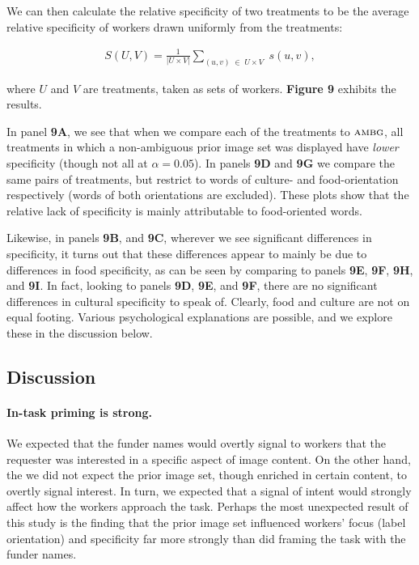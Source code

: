 \documentclass[a4paper]{report}
\begin{document}
We can then calculate the relative specificity of two treatments to be the
average relative specificity of workers drawn uniformly from the treatments:

\begin{align}
	S(U,V) = 
		\frac{1}{|U \times V|}
		\sum_{(u,v) \; \in \; U \times V} \;
		s(u,v),
		\label{eq:specificity}
\end{align}

where $U$ and $V$ are treatments, taken as sets of workers. \textbf{Figure 9} 
exhibits the results.

In panel \textbf{9A}, we see that when we compare each of the treatments to
$\textsc{ambg}$, all treatments in which a non-ambiguous prior image set was 
displayed have \textit{lower} specificity (though not all at $\alpha=0.05$).  
In panels \textbf{9D} and \textbf{9G} we compare the same pairs of treatments, 
but restrict to words of culture- and food-orientation respectively (words
of both orientations are excluded).  These plots show that the relative lack 
of specificity is mainly attributable to food-oriented words.  

Likewise, in panels \textbf{9B}, and \textbf{9C}, 
wherever we see significant differences in specificity, it turns out that
these differences appear to mainly be due to differences in food specificity,
as can be seen by comparing to panels \textbf{9E}, \textbf{9F}, \textbf{9H}, 
and \textbf{9I}.  In fact, looking to panels \textbf{9D}, \textbf{9E}, and 
\textbf{9F},
there are no significant differences in cultural specificity to speak of. 
Clearly, food and culture are not on equal footing.  Various psychological 
explanations are possible, and we explore these in the discussion below.

\subsection*{Discussion}

\paragraph{In-task priming is strong.}  We expected that the funder names 
would overtly signal to workers that the requester was interested in a 
specific aspect of image content.  On the other hand, the we did not 
expect the prior image set, though enriched in certain content, to overtly signal interest.  In turn, we expected that a signal of intent would 
strongly affect how the workers approach the task.  Perhaps the most unexpected
result of this study is the finding that the prior image set influenced 
workers' focus (label orientation) and specificity far more strongly than did 
framing the task with the funder names.
\end{document}
